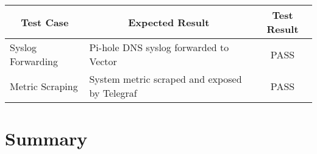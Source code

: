 \documentclass[../index.tex]{subfiles}
\begin{document}
\begin{center}
  \begin{tabular}{|l|l|c|} 
    \hline
    \multicolumn{1}{|c|}{Test Case} & \multicolumn{1}{c|}{Expected Result} & \multicolumn{1}{c|}{Test Result} \\
    \hline
    Syslog Forwarding               & Pi-hole DNS syslog forwarded to Vector & PASS \\ 
    Metric Scraping                 & System metric scraped and exposed by Telegraf & PASS \\ 
    \hline
  \end{tabular}
  \label{table:whitebox_pihole}
\end{center}

\section{Summary}

\end{document}
